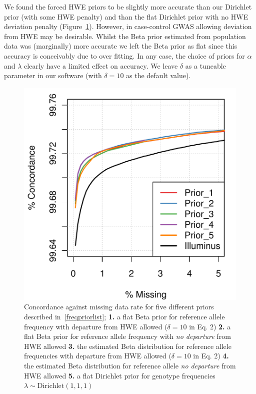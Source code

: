 We found the forced HWE priors to be slightly more accurate than our Dirichlet prior (with some HWE penalty) and than the flat Dirichlet prior with no HWE deviation penalty (Figure~\ref{freq_prior_comparison}).  However, in case-control GWAS allowing deviation from HWE may be desirable.  Whilst the Beta prior estimated from population data was (marginally) more accurate we left the Beta prior as flat since this accuracy is conceivably due to over fitting.  In any case, the choice of priors for $\alpha$ and $\lambda$ clearly have a limited effect on accuracy. We leave $\delta$ as a tuneable parameter in our software (with $\delta=10$ as the default value). 

\begin{figure}
\centering
\includegraphics[width=.5\textwidth]{chap2figs/SupFig3}
\caption[Evaluation of prior choices for allele frequency]{Concordance against missing data rate for five different priors described in~\ref{freqpriorlist}; \textbf{1.} a flat Beta prior for reference allele frequency with departure from HWE allowed ($\delta=10$ in Eq. 2)
\textbf{2.} a flat Beta prior for reference allele frequency with \emph{no departure} from HWE allowed
\textbf{3.} the estimated Beta distribution for reference allele frequencies with departure from HWE allowed ($\delta=10$ in Eq. 2)
\textbf{4.} the estimated Beta distribution for reference allele  \emph{no departure} from HWE allowed
\textbf{5.} a flat Dirichlet prior for genotype frequencies $\lambda \sim \textrm{Dirichlet}(1,1,1)$
\label{freq_prior_comparison}}
\end{figure}


